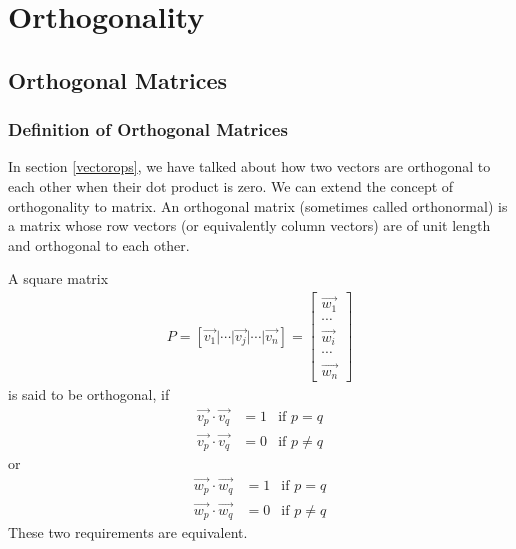 \chapter{Orthogonality}

\section{Orthogonal Matrices}
\subsection{Definition of Orthogonal Matrices}
In section \ref{vectorops}, we have talked about how two vectors are orthogonal to each other when their dot product is zero. We can extend the concept of orthogonality to matrix. An orthogonal matrix (sometimes called orthonormal) is a matrix whose row vectors (or equivalently column vectors) are of unit length and orthogonal to each other.

\begin{defn}
\label{orthomatrix}
A square matrix
\begin{align*}
P = [\vec{v_1}|\cdots|\vec{v_j}|\cdots|\vec{v_n}] =
\left[
\begin{array}{c}
\vec{w_1} \\
\hline
\cdots \\
\hline
\vec{w_i} \\
\hline
\cdots \\
\hline
\vec{w_n}
\end{array}
\right]
\end{align*}
is said to be orthogonal, if 
\begin{align*}
\vec{v_p} \cdot \vec{v_q} &= 1 & \text{if } p = q \\
\vec{v_p} \cdot \vec{v_q} &= 0 & \text{if } p \neq q
\end{align*}
or 
\begin{align*}
\vec{w_p} \cdot \vec{w_q} &= 1 & \text{if } p = q \\
\vec{w_p} \cdot \vec{w_q} &= 0 & \text{if } p \neq q
\end{align*}
These two requirements are equivalent.
\end{defn}

